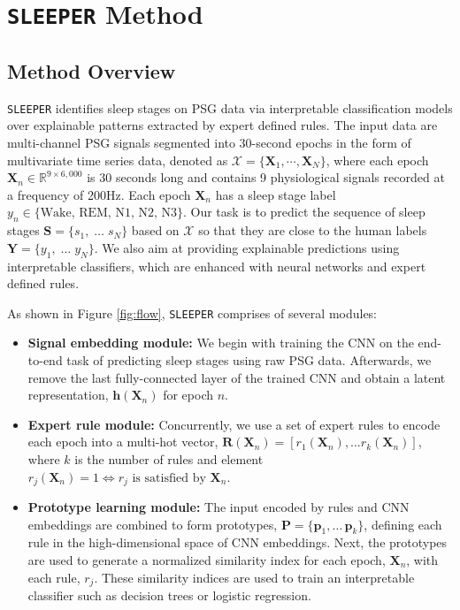 \documentclass[pmlr]{jmlr}
\newcommand{\mname}
{\texttt{SLEEPER}\xspace}
\begin{document}
\section{\mname Method}

\subsection{Method Overview}



\mname identifies sleep stages on PSG data via interpretable classification models over explainable patterns extracted by expert defined rules. The input data are multi-channel PSG signals segmented into 30-second epochs in the form of multivariate time series data, denoted as 
$\mathcal{X} = \{\bm{X}_1, \cdots, \bm{X}_N\}$, where each epoch $\bm{X}_n \in \mathbb{R}^{9\times6,000}$ is 30 seconds long and contains 9 physiological signals recorded at a frequency of 200Hz. Each epoch $\bm{X}_n$ has a sleep stage label $y_n \in \{\text{Wake, REM, N1, N2, N3}\}$. Our task is to predict the sequence of sleep stages $\bm{S}=\{s_1, \; \dots \; s_N\}$ based on $\mathcal{X}$ so that they are close to the human labels $\bm{Y}=\{y_1, \; \dots \; y_N\}$. We also aim at providing explainable predictions using interpretable classifiers, which are enhanced with neural networks and expert defined rules.

As shown in Figure \ref{fig:flow}, \mname comprises of several modules:\begin{itemize}
    \item {\bf Signal embedding module:} We begin with training the CNN on the end-to-end task of predicting sleep stages using raw PSG data. Afterwards, we remove the last fully-connected layer of the trained CNN and obtain a latent representation, $\bm{h}(\bm{X}_n)$ for epoch $n$.
    \item {\bf Expert rule module:} Concurrently, we use a set of expert rules to encode each epoch into a multi-hot vector, $\bm{R}(\bm{X}_n)=[r_1(\bm{X}_n), \dots r_k(\bm{X}_n)]$, where $k$ is the number of rules and element $r_j(\bm{X}_n)=1 \Leftrightarrow r_j\text{ is satisfied by }\bm{X}_n$. 
    \item {\bf Prototype learning module:} The input encoded by rules and CNN embeddings are combined to form prototypes, $\bm{P} = \{ \bm{p}_1, \dots \, \bm{p}_k \}$, defining each rule in the high-dimensional space of CNN embeddings. Next, the prototypes are used to generate a normalized similarity index for each epoch, $\bm{X}_n$, with each rule, $r_j$. These similarity indices are used to train an interpretable classifier such as decision trees or logistic regression. 
\end{itemize}
\end{document}
